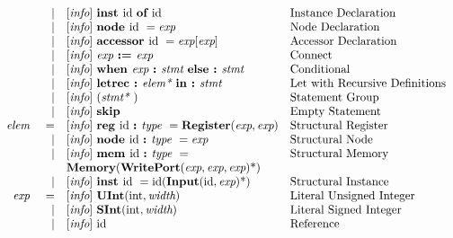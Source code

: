 \documentclass[12pt]{article}
\begin{document}
\[\begin{array}{rrll}
                &\vert &[\text{\em info}]\  \text{\bf inst\ } \text{id } \text{\bf of\ } \text{id }                                               &\text{Instance Declaration}\\
                &\vert &[\text{\em info}]\  \text{\bf node\ } \text{id }  = \text{\em exp\ }                               &\text{Node Declaration}\\
                &\vert &[\text{\em info}]\  \text{\bf accessor\ } \text{id } = \text{\em exp}[\text{\em exp}]                                &\text{Accessor Declaration}\\
                &\vert &[\text{\em info}]\  \text{\em exp\ } \text{\bf :=\ } \text{\em exp\ }                                               &\text{Connect}\\
                &\vert &[\text{\em info}]\  \text{\bf when\ } \text{\em exp\ } \text{\bf :\ } \text{\em stmt\ } \text{\bf else :\ } \text{\em stmt\ }               &\text{Conditional}\\
                &\vert &[\text{\em info}]\  \text{\bf letrec :\ } \text{\em elem*\ } \text{\bf in :\ } \text{\em stmt\ }                            &\text{Let with Recursive Definitions}\\
                &\vert &[\text{\em info}]\  (\text{\em stmt*\ })                                                            &\text{Statement Group}\\
                &\vert &[\text{\em info}]\  \text{\bf skip\ }                                                               &\text{Empty Statement}\\
\text{\em elem\ }       &=     &[\text{\em info}]\  \text{\bf reg\ } \text{id } \text{\bf :\ } \text{\em type\ } = \text{\bf Register}(\text{\em exp}, \text{\em exp})    &\text{Structural Register}\\
                &\vert &[\text{\em info}]\  \text{\bf node\ } \text{id } \text{\bf :\ } \text{\em type\ } = \text{\em exp\ }                               &\text{Structural Node}\\
                &\vert &[\text{\em info}]\  \text{\bf mem\ } \text{id } \text{\bf :\ } \text{\em type\ } =                                         &\text{Structural Memory}\\
                &      &\text{\bf Memory}(\text{\bf WritePort}(\text{\em exp}, \text{\em exp}, \text{\em exp})\text{*})  &\\
                &\vert &[\text{\em info}]\  \text{\bf inst\ } \text{id } = \text{id}(\text{\bf Input}(\text{id},\text{\em exp})\text{*})               &\text{Structural Instance}\\
\text{\em exp\ }        &=     &[\text{\em info}]\  \text{\bf UInt}(\text{int}, \text{\em width})                                          &\text{Literal Unsigned Integer}\\
                &\vert &[\text{\em info}]\  \text{\bf SInt}(\text{int}, \text{\em width})                                          &\text{Literal Signed Integer}\\
                &\vert &[\text{\em info}]\  \text{id }                                                                     &\text{Reference}\\

\end{array}\]
\end{document}
